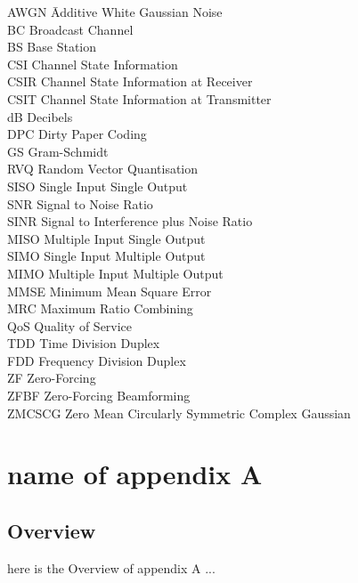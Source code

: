 \documentclass[a4paper,twoside,phd]{BYUPhys}
\begin{document}
\begin{tabbing}

AWGN \qquad \qquad \= Additive White Gaussian Noise\\
BC \> Broadcast Channel\\
BS \> Base Station\\
CSI \> Channel State Information\\
CSIR \> Channel State Information at Receiver\\
CSIT \> Channel State Information at Transmitter\\
dB \> Decibels\\
DPC \> Dirty Paper Coding\\
GS \> Gram-Schmidt\\
RVQ \> Random Vector Quantisation\\
SISO \> Single Input Single Output\\
SNR \> Signal to Noise Ratio\\
SINR \> Signal to Interference plus Noise Ratio\\
MISO \> Multiple Input Single Output\\
SIMO \> Single Input Multiple Output\\
MIMO \> Multiple Input Multiple Output\\
MMSE \> Minimum Mean Square Error\\
MRC \> Maximum Ratio Combining\\
QoS \> Quality of Service\\
TDD \> Time Division Duplex\\
FDD \> Frequency Division Duplex\\
ZF \> Zero-Forcing\\
ZFBF \> Zero-Forcing Beamforming\\
ZMCSCG \> Zero Mean Circularly Symmetric Complex Gaussian\\

\end{tabbing}


\appendix
\chapter{name of appendix A}
\section{Overview}
here is the Overview of appendix A ...
\end{document}
